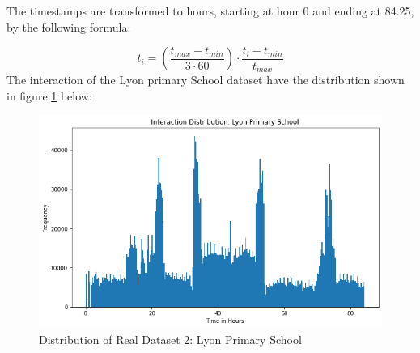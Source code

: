 The timestamps are transformed to hours, starting at hour 0 and ending at 84.25, by the following formula:

\begin{equation}
    t_i = \left(\frac{t_{max} - t_{min}}{3 \cdot 60} \right) \cdot \frac{t_i - t_{min}}{t_{max}}
\end{equation}
The interaction of the Lyon primary School dataset have the distribution shown in figure \ref{fig:RLdataset3} below:

\begin{figure}[H]
    \centering
    \includegraphics[width=\textwidth]{0_images/real_dataset_3_dist.png}
    \caption{Distribution of Real Dataset 2: Lyon Primary School}
    \label{fig:RLdataset3}
\end{figure}








